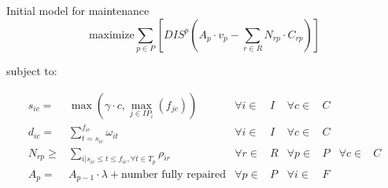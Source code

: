\documentclass{beamer}
\begin{document}
\begin{frame}{Initial model for maintenance}
\begin{equation}
	\text{maximize} \sum_{p \in P} [ DIS^p (A_p \cdot v_p - \sum_{r \in R} N_{rp} \cdot C_{rp}) ]
\end{equation}

\bigskip
subject to:

\begin{align}
s_{ic} =& \max_{}(\gamma \cdot c, \max_{j \in IP_i}(f_{jc}))			&	\forall i \in& I 	&	\forall c \in& C				\\
d_{ic} =& \sum_{t = s_{ic}}^{f_{ic}} \omega_{it} 					& 	\forall i \in& I		&	\forall c \in& C				\\
N_{rp} \geq& \sum_{i | s_{ic} \leq t \leq f_{ic}, \forall t \in T_p} \rho_{ir}		& 	\forall r \in& R   	&	\forall p \in& P 	&	\forall c \in& C\\
A_p =&  A_{p-1} \cdot \lambda + \text{number fully repaired}			&	\forall p \in& P         	&	\forall i \in& F
\end{align}

\end{frame}
\end{document}
